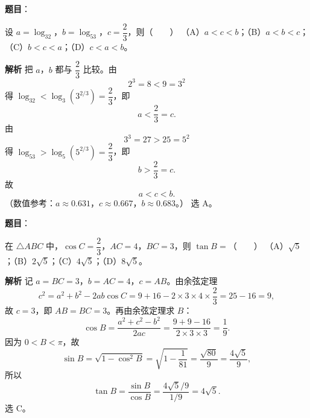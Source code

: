 \begin{answer}

\textbf{题目}：

设 $a=\log_32$，$b=\log_53$，$c=\dfrac23$，则\mbox{（　　）}
（A）$a<c<b$；（B）$a<b<c$；（C）$b<c<a$；（D）$c<a<b$。

\textbf{解析}
把 $a$，$b$ 都与 $\dfrac23$ 比较。由
\nopagebreak[4]
\[2^3=8<9=3^2\]
得 $\log_32<\log_3\left(3^{2/3}\right)=\dfrac23$，即
\nopagebreak[4]
\[a<\frac23=c .\]
由
\nopagebreak[4]
\[3^3=27>25=5^2\]
得 $\log_53>\log_5\left(5^{2/3}\right)=\dfrac23$，即
\nopagebreak[4]
\[b>\frac23=c .\]
故
\nopagebreak[4]
\[a<c<b .\]
（数值参考：$a\approx0.631$，$c\approx0.667$，$b\approx0.683$。）
选 A。


\end{answer}
\begin{answer}

\textbf{题目}：

在 $\triangle ABC$ 中，$\cos C=\dfrac23$，$AC=4$，$BC=3$，则 $\tan B=$\mbox{（　　）}
（A）$\sqrt5$；（B）$2\sqrt5$；（C）$4\sqrt5$；（D）$8\sqrt5$。

\textbf{解析}
记 $a=BC=3$，$b=AC=4$，$c=AB$。由余弦定理
\nopagebreak[4]
\[c^2=a^2+b^2-2ab\cos C=9+16-2\times3\times4\times\frac23=25-16=9,\]
故 $c=3$，即 $AB=BC=3$。再由余弦定理求 $B$：
\nopagebreak[4]
\[\cos B=\frac{a^2+c^2-b^2}{2ac}=\frac{9+9-16}{2\times3\times3}=\frac19 .\]
因为 $0<B<\pi$，故
\nopagebreak[4]
\[\sin B=\sqrt{1-\cos^2B}=\sqrt{1-\frac1{81}}=\frac{\sqrt{80}}9=\frac{4\sqrt5}9,\]
所以
\nopagebreak[4]
\[\tan B=\frac{\sin B}{\cos B}=\frac{4\sqrt5/9}{1/9}=4\sqrt5 .\]
选 C。


\end{answer}
